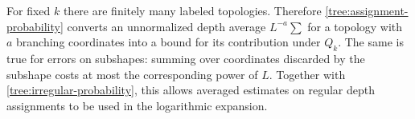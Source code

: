 \begin{remark}\label{tree:averaging-remark}
For fixed $k$ there are finitely many labeled topologies.  Therefore
\eqref{tree:assignment-probability} converts an unnormalized depth
average $L^{-a}\sum$ for a topology with $a$ branching coordinates
into a bound for its contribution under $Q_k$.  The same is true for
errors on subshapes: summing over coordinates discarded by the
subshape costs at most the corresponding power of $L$.  Together
with \eqref{tree:irregular-probability}, this allows averaged estimates
on regular depth assignments to be used in the logarithmic expansion.
\end{remark}
